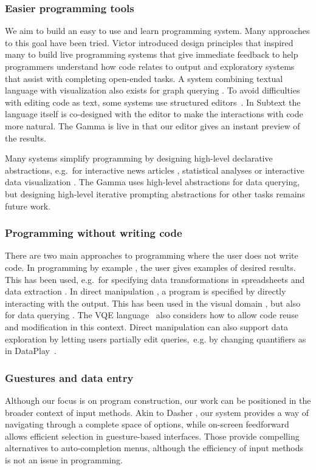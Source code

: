 \documentclass[manuscript,review,anonymous]{acmart}
\begin{document}
\subsubsection*{Easier programming tools}
We aim to build an easy to use and learn programming system. Many approaches to this
goal have been tried. Victor \cite{learnable,principle} introduced design principles that
inspired many to build live programming systems \cite{review,liveroad,lighttable} that give
immediate feedback to help programmers understand how code relates to output and
exploratory systems \cite{variolite,exploratory} that assist with completing open-ended tasks.
A system combining textual language with visualization also exists for graph querying \cite{guess}.
To avoid difficulties with editing code as text, some systems use structured editors~\cite{structure-based,livenut,lamdu}.
In Subtext \cite{subtext,directprog} the language itself is co-designed with the editor to make
the interactions with code more natural. The Gamma is live in that our editor gives an instant
preview of the results.

Many systems simplify programming by designing high-level declarative abstractions,
e.g.~for interactive news articles \cite{idyll}, statistical analyses \cite{tea}
or interactive data visualization \cite{interactionviz,vegalite}. The Gamma uses
high-level abstractions for data querying, but designing high-level iterative prompting
abstractions for other tasks remains future work.

\subsubsection*{Programming without writing code}
There are two main approaches to programming where
the user does not write code. In programming by example \cite{byexample}, the user gives
examples of desired results. This has been used, e.g.~for specifying data transformations
in spreadsheets and data extraction \cite{spreadsheetpbe,flashextract}.
In direct manipulation \cite{direct}, a program is specified by directly interacting with the
output. This has been used in the visual domain \cite{sketchnsketch}, but also for data querying
\cite{dynamicq,vlang}. The VQE language~\cite{visage} also considers how to allow code reuse and
modification in this context. Direct manipulation can also support data exploration by letting
users partially edit queries,~e.g. by changing quantifiers as in DataPlay~\cite{dataplay}.

\subsubsection*{Guestures and data entry}
Although our focus is on program construction, our work can be positioned in the
broader context of input methods. Akin to Dasher \cite{dasher}, our system provides a way of
navigating through a complete space of options, while on-screen feedforward \cite{octopocus} allows
efficient selection in guesture-based interfaces. Those provide compelling alternatives to
auto-completion menus, although the efficiency of input methods is not an issue in programming.
\end{document}
